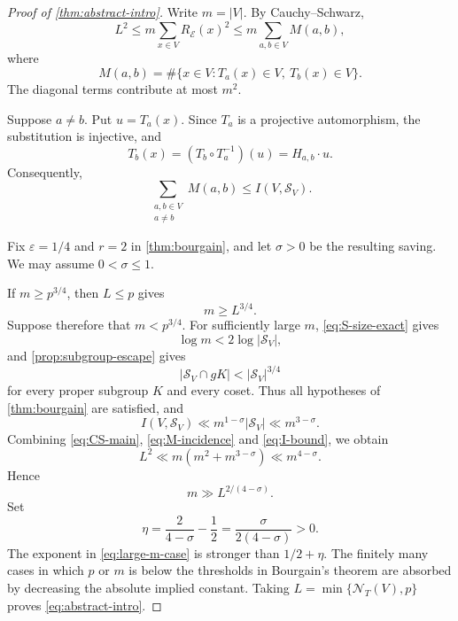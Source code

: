 \documentclass[11pt,reqno]{amsart}
\numberwithin{equation}{section}
\theoremstyle{definition}
\theoremstyle{remark}
\newcommand{\cE}{\mathcal E}
\newcommand{\cN}{\mathcal N}
\newcommand{\cS}{\mathcal S}
\begin{document}
\begin{proof}[Proof of \cref{thm:abstract-intro}]
Write $m=|V|$.  By Cauchy--Schwarz,
\begin{equation}\label{eq:CS-main}
  L^2
  \le m\sum_{x\in V}R_{\cE}(x)^2
  \le m\sum_{a,b\in V}M(a,b),
\end{equation}
where
\begin{equation}\label{eq:M-ab}
  M(a,b)
  =\#\{x\in V:T_a(x)\in V,\ T_b(x)\in V\}.
\end{equation}
The diagonal terms contribute at most $m^2$.

Suppose $a\ne b$.  Put $u=T_a(x)$.  Since $T_a$ is a projective automorphism, the substitution is injective, and
\[
  T_b(x)=(T_b\circ T_a^{-1})(u)=H_{a,b}\cdot u.
\]
Consequently,
\begin{equation}\label{eq:M-incidence}
  \sum_{\substack{a,b\in V\\a\ne b}}M(a,b)
  \le I(V,\cS_V).
\end{equation}

Fix $\varepsilon=1/4$ and $r=2$ in \cref{thm:bourgain}, and let $\sigma>0$ be the resulting saving.  We may assume $0<\sigma\le1$.

If $m\ge p^{3/4}$, then $L\le p$ gives
\begin{equation}\label{eq:large-m-case}
  m\ge L^{3/4}.
\end{equation}
Suppose therefore that $m<p^{3/4}$.  For sufficiently large $m$, \eqref{eq:S-size-exact} gives
\[
  \log m<2\log|\cS_V|,
\]
and \cref{prop:subgroup-escape} gives
\[
  |\cS_V\cap gK|<|\cS_V|^{3/4}
\]
for every proper subgroup $K$ and every coset.  Thus all hypotheses of \cref{thm:bourgain} are satisfied, and
\begin{equation}\label{eq:I-bound}
  I(V,\cS_V)
  \ll m^{1-\sigma}|\cS_V|
  \ll m^{3-\sigma}.
\end{equation}
Combining \eqref{eq:CS-main}, \eqref{eq:M-incidence} and \eqref{eq:I-bound}, we obtain
\begin{equation}\label{eq:L-bound}
  L^2\ll m(m^2+m^{3-\sigma})\ll m^{4-\sigma}.
\end{equation}
Hence
\begin{equation}\label{eq:m-from-L}
  m\gg L^{2/(4-\sigma)}.
\end{equation}
Set
\begin{equation}\label{eq:eta-def}
  \eta=\frac{2}{4-\sigma}-\frac12
  =\frac{\sigma}{2(4-\sigma)}>0.
\end{equation}
The exponent in \eqref{eq:large-m-case} is stronger than $1/2+\eta$.  The finitely many cases in which $p$ or $m$ is below the thresholds in Bourgain's theorem are absorbed by decreasing the absolute implied constant.  Taking $L=\min\{\cN_T(V),p\}$ proves \eqref{eq:abstract-intro}.
\end{proof}
\end{document}
